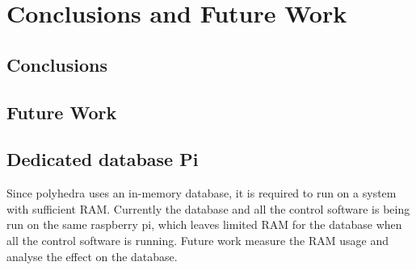 \section{Conclusions and Future Work}
\subsection{Conclusions}


\subsection{Future Work}
\subsection{Dedicated database Pi}
Since polyhedra uses an in-memory database, it is required to run on a system with sufficient RAM. Currently the database and all the control software is being run on the same raspberry pi, which leaves limited RAM for the database when all the control software is running. Future work measure the RAM usage and analyse the effect on the database.
